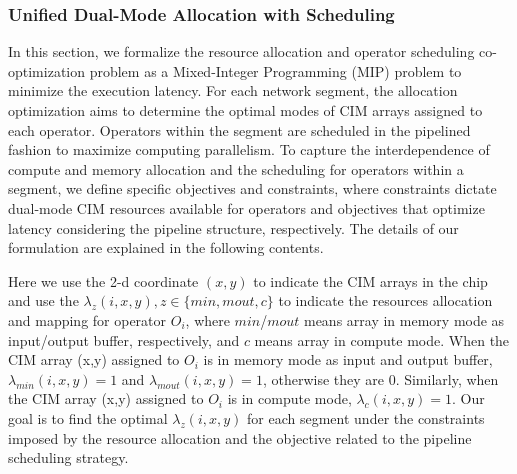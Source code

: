 \subsubsection{Unified Dual-Mode Allocation with Scheduling}
In this section, we formalize the resource allocation and operator scheduling co-optimization problem as a Mixed-Integer Programming (MIP) problem to minimize the execution latency.
For each network segment, the allocation optimization aims to determine the optimal modes of CIM arrays assigned to each operator. Operators within the segment are scheduled in the pipelined fashion to maximize computing parallelism. To capture the interdependence of compute and memory allocation and the scheduling for operators within a segment, we define specific objectives and constraints, where constraints dictate dual-mode CIM resources available for operators and objectives that optimize latency considering the pipeline structure, respectively.
The details of our formulation are explained in the following contents.

Here we use the 2-d coordinate $(x,y)$ to indicate the CIM arrays in the chip and use the $\lambda_{z}(i,x,y), z \in \{min, mout, c\}$ to indicate the resources allocation and mapping for operator $O_i$, 
where $min$/$mout$ means array in memory mode as input/output buffer, respectively, and $c$ means array in compute mode. 
When the CIM array (x,y) assigned to $O_i$ is in memory mode as input and output buffer, $\lambda_{min}(i,x,y)=1$ and $\lambda_{mout}(i,x,y)=1$, otherwise they are 0. Similarly, when the CIM array (x,y) assigned to $O_i$ is in compute mode, $\lambda_{c}(i,x,y)=1$.
Our goal is to find the optimal $\lambda_{z}(i,x,y)$ for each segment under the constraints imposed by the resource allocation and the objective related to the pipeline scheduling strategy.

